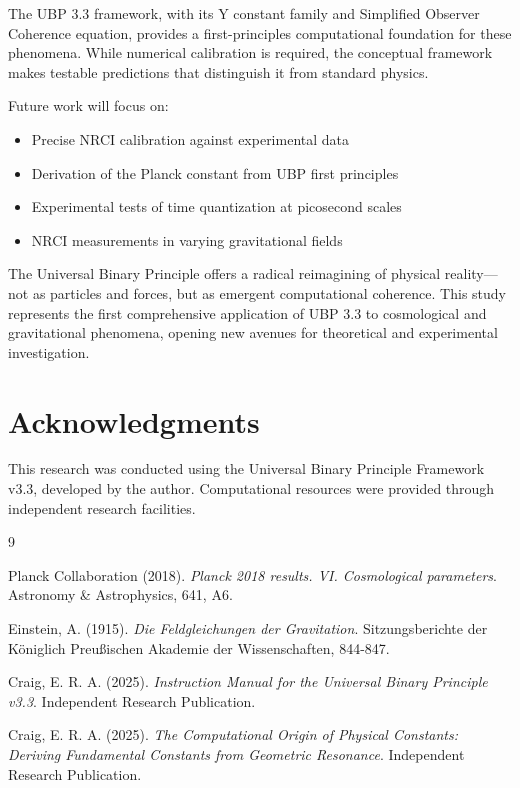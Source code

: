 \documentclass[12pt,a4paper]{article}
\begin{document}
The UBP 3.3 framework, with its Y constant family and Simplified Observer Coherence equation, provides a first-principles computational foundation for these phenomena. While numerical calibration is required, the conceptual framework makes testable predictions that distinguish it from standard physics.

Future work will focus on:
\begin{itemize}
\item Precise NRCI calibration against experimental data
\item Derivation of the Planck constant from UBP first principles
\item Experimental tests of time quantization at picosecond scales
\item NRCI measurements in varying gravitational fields
\end{itemize}

The Universal Binary Principle offers a radical reimagining of physical reality---not as particles and forces, but as emergent computational coherence. This study represents the first comprehensive application of UBP 3.3 to cosmological and gravitational phenomena, opening new avenues for theoretical and experimental investigation.

\section*{Acknowledgments}

This research was conducted using the Universal Binary Principle Framework v3.3, developed by the author. Computational resources were provided through independent research facilities.

\begin{thebibliography}{9}

Planck Collaboration (2018).
\textit{Planck 2018 results. VI. Cosmological parameters}.
Astronomy \& Astrophysics, 641, A6.

Einstein, A. (1915).
\textit{Die Feldgleichungen der Gravitation}.
Sitzungsberichte der Königlich Preußischen Akademie der Wissenschaften, 844-847.

Craig, E. R. A. (2025).
\textit{Instruction Manual for the Universal Binary Principle v3.3}.
Independent Research Publication.

Craig, E. R. A. (2025).
\textit{The Computational Origin of Physical Constants: Deriving Fundamental Constants from Geometric Resonance}.
Independent Research Publication.

\end{thebibliography}
\end{document}
